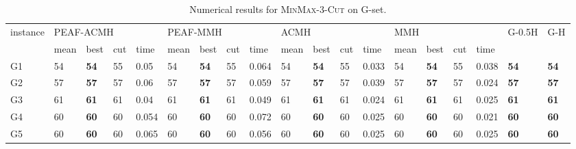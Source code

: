 \documentclass[12pt, a4paper]{article}%
\renewcommand{\arraystretch}{1.3}
\numberwithin{equation}{section}
\theoremstyle{plain}
\begin{document}
			
			{
				\scriptsize
				\setlength{\tabcolsep}{8.5pt}
				\renewcommand{\arraystretch}{1.2}
				\begin{landscape}
					\begin{longtable}{lllllllllllllllllll}
						\caption[Results for \textsc{MinMax}-$3$-\textsc{Cut}]{Numerical results for \textsc{MinMax}-$3$-\textsc{Cut} on G-set.}
						\label{tab::min-max3cut}\\
						\hline
						\multirow{2}{*}{instance} & \multicolumn{4}{l}{PEAF-ACMH}               & \multicolumn{4}{l}{PEAF-MMH}                & \multicolumn{4}{l}{ACMH}                   & \multicolumn{4}{l}{MMH}                    & \multirow{2}{*}{G-0.5H} & \multirow{2}{*}{G-H} \\ \cline{2-17}
						& mean    & best           & cut   & time      & mean    & best           & cut   & time     & mean    & best           & cut   & time      & mean    & best           & cut   & time     &                         &                      \\ \hline
						G1                                            & 54   & \textbf{54} & 55  & 0.05  & 54   & \textbf{54} & 55  & 0.064 & 54   & \textbf{54} & 55  & 0.033 & 54   & \textbf{54} & 55  & 0.038 & \textbf{54}                                 & \textbf{54}                              \\
						G2                                            & 57   & \textbf{57} & 57  & 0.06  & 57   & \textbf{57} & 57  & 0.059 & 57   & \textbf{57} & 57  & 0.039 & 57   & \textbf{57} & 57  & 0.024 & \textbf{57}                                 & \textbf{57}                              \\
						G3                                            & 61   & \textbf{61} & 61  & 0.04  & 61   & \textbf{61} & 61  & 0.049 & 61   & \textbf{61} & 61  & 0.024 & 61   & \textbf{61} & 61  & 0.025 & \textbf{61}                                 & \textbf{61}                              \\
						G4                                            & 60   & \textbf{60} & 60  & 0.054 & 60   & \textbf{60} & 60  & 0.072 & 60   & \textbf{60} & 60  & 0.025 & 60   & \textbf{60} & 60  & 0.021 & \textbf{60}                                 & \textbf{60}                              \\
						G5                                            & 60   & \textbf{60} & 60  & 0.065 & 60   & \textbf{60} & 60  & 0.056 & 60   & \textbf{60} & 60  & 0.025 & 60   & \textbf{60} & 60  & 0.025 & \textbf{60}                                 & \textbf{60}                              \\

\end{longtable}
\end{landscape}}
\end{document}
